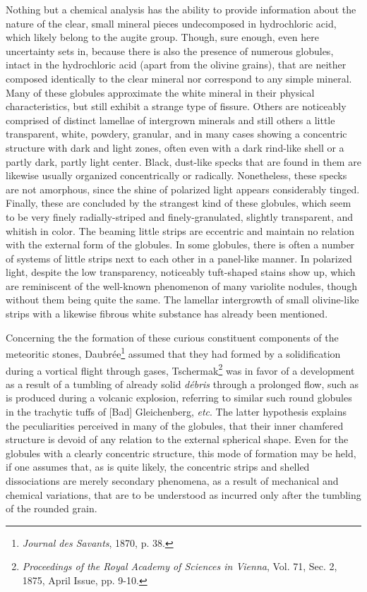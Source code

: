\documentclass[a4paper, 12pt, oneside]{article}
\begin{document}
Nothing but a chemical analysis has the ability to provide information about the nature of the clear, small mineral pieces undecomposed in hydrochloric acid, which likely belong to the augite group. Though, sure enough, even here uncertainty sets in, because there is also the presence of numerous globules, intact in the hydrochloric acid (apart from the olivine grains), that are neither composed identically to the clear mineral nor correspond to any simple mineral. Many of these globules approximate the white mineral in their physical characteristics, but still exhibit a strange type of fissure. Others are noticeably comprised of distinct lamellae of intergrown minerals and still others a little transparent, white, powdery, granular, and in many cases showing a concentric structure with dark and light zones, often even with a dark rind-like shell or a partly dark, partly light center. Black, dust-like specks that are found in them are likewise usually organized concentrically or radically. Nonetheless, these specks are not amorphous, since the shine of polarized light appears considerably tinged. Finally, these are concluded by the strangest kind of these globules, which seem to be very finely radially-striped and finely-granulated, slightly transparent, and whitish in color. The beaming little strips are eccentric and maintain no relation with the external form of the globules. In some globules, there is often a number of systems of little strips next to each other in a panel-like manner. In polarized light, despite the low transparency, noticeably tuft-shaped stains show up, which are reminiscent of the well-known phenomenon of many variolite nodules, though without them being quite the same. The lamellar intergrowth of small olivine-like strips with a likewise fibrous white substance has already been mentioned.

Concerning the the formation of these curious constituent components of the meteoritic stones, Daubrée\footnote{\emph{Journal des Savants}, 1870, p. 38.} assumed that they had formed by a solidification during a vortical flight through gases, Tschermak\footnote{\emph{Proceedings of the Royal Academy of Sciences in Vienna}, Vol. 71, Sec. 2, 1875, April Issue, pp. 9-10.} was in favor of a development as a result of a tumbling of already solid \emph{débris} through a prolonged flow, such as is produced during a volcanic explosion, referring to similar such round globules in the trachytic tuffs of [Bad] Gleichenberg, \emph{etc}. The latter hypothesis explains the peculiarities perceived in many of the globules, that their inner chamfered structure is devoid of any relation to the external spherical shape. Even for the globules with a clearly concentric structure, this mode of formation may be held, if one assumes that, as is quite likely, the concentric strips and shelled dissociations are merely secondary phenomena, as a result of mechanical and chemical variations, that are to be understood as incurred only after the tumbling of the rounded grain.
\end{document}
